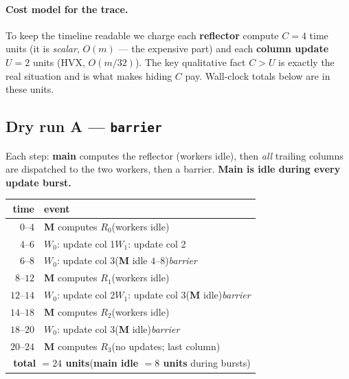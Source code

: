\documentclass[11pt]{article}
\newcommand{\code}[1]{\texttt{\small #1}}
\newcommand{\work}[1]{\textcolor{workcol}{#1}}
\begin{document}
\paragraph{Cost model for the trace.} To keep the timeline readable we charge each
\textbf{reflector} compute $C{=}4$ time units (it is \emph{scalar}, $O(m)$ --- the
expensive part) and each \textbf{column update} $U{=}2$ units (HVX, $O(m/32)$). The key
qualitative fact $C>U$ is exactly the real situation and is what makes hiding $C$ pay.
Wall-clock totals below are in these units.

\subsection{Dry run A --- \code{barrier}}
Each step: \textbf{main} computes the reflector (workers idle), then \emph{all} trailing
columns are dispatched to the two workers, then a barrier. \textbf{Main is idle during
every update burst.}

\begin{center}\small
\begin{tabular}{@{}rl@{}}
\toprule
\textbf{time} & \textbf{event} \\
\midrule
$0$--$4$   & \textbf{M} computes $R_0$\quad(workers idle) \\
$4$--$6$   & \work{$W_0$}: update col 1\qquad \work{$W_1$}: update col 2 \\
$6$--$8$   & \work{$W_0$}: update col 3\qquad(\textbf{M} idle $4$--$8$)\quad\textit{barrier} \\
$8$--$12$  & \textbf{M} computes $R_1$\quad(workers idle) \\
$12$--$14$ & \work{$W_0$}: update col 2\qquad \work{$W_1$}: update col 3\quad(\textbf{M} idle)\;\textit{barrier} \\
$14$--$18$ & \textbf{M} computes $R_2$\quad(workers idle) \\
$18$--$20$ & \work{$W_0$}: update col 3\qquad(\textbf{M} idle)\;\textit{barrier} \\
$20$--$24$ & \textbf{M} computes $R_3$\quad(no updates; last column) \\
\midrule
\multicolumn{2}{r}{\textbf{total $=24$ units}\quad(\textbf{main idle $=8$ units} during bursts)} \\
\bottomrule
\end{tabular}
\end{center}
\end{document}
